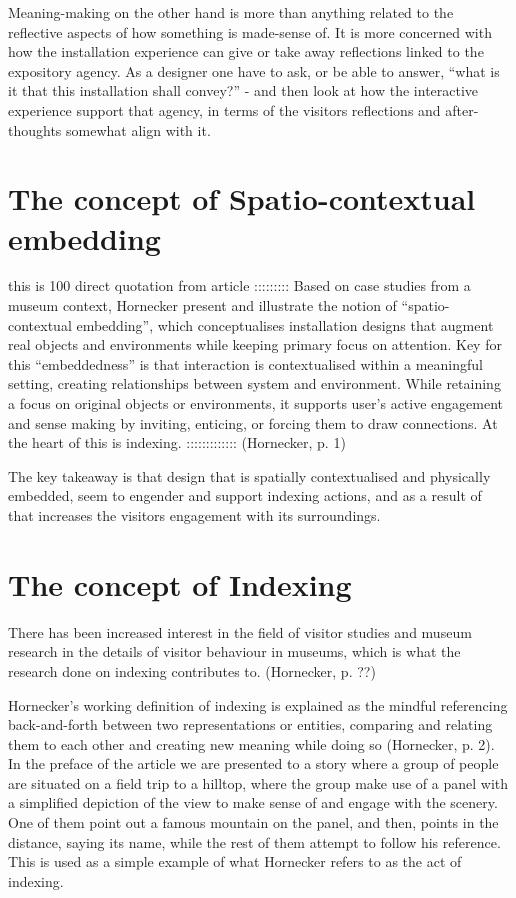 Meaning-making on the other hand is more than anything related to the reflective aspects of how something is made-sense of. It is more concerned with how the installation experience can give or take away reflections linked to the expository agency. As a designer one have to ask, or be able to answer, “what is it that this installation shall convey?” - and then look at how the interactive experience support that agency, in terms of the visitors reflections and after-thoughts somewhat align with it.

\section{The concept of Spatio-contextual embedding}
this is 100 direct quotation from article ::::::::: Based on case studies from a museum context, Hornecker present and illustrate the notion of “spatio-contextual embedding”, which conceptualises installation designs that augment real objects and environments while keeping primary focus on attention. Key for this “embeddedness” is that interaction is contextualised within a meaningful setting, creating relationships between system and environment. While retaining a focus on original objects or environments, it supports user’s active engagement and sense making by inviting, enticing, or forcing them to draw connections. At the heart of this is indexing. ::::::::::::: (Hornecker, p. 1)

The key takeaway is that design that is spatially contextualised and physically embedded, seem to engender and support indexing actions, and as a result of that increases the visitors engagement with its surroundings.


\section{The concept of Indexing}
There has been increased interest in the field of visitor studies and museum research in the details of visitor behaviour in museums, which is what the research done on indexing contributes to. (Hornecker, p. ??)

Hornecker’s working definition of indexing is explained as the mindful referencing back-and-forth between two representations or entities, comparing and relating them to each other and creating new meaning while doing so (Hornecker, p. 2). In the preface of the article we are presented to a story where a group of people are situated on a field trip to a hilltop, where the group make use of a panel with a simplified depiction of the view to make sense of and engage with the scenery. One of them point out a famous mountain on the panel, and then, points in the distance, saying its name, while the rest of them attempt to follow his reference. This is used as a simple example of what Hornecker refers to as the act of indexing.

